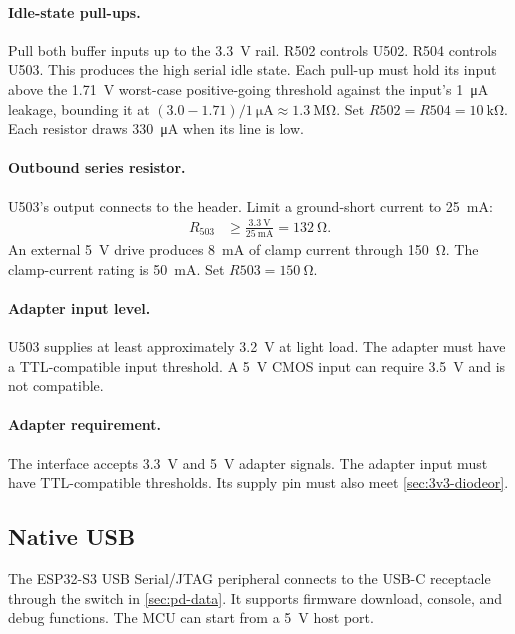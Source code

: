 \paragraph{Idle-state pull-ups.} Pull both buffer inputs up to the 3.3~V rail.
R502 controls U502. R504 controls U503. This produces the high serial idle
state. Each pull-up must hold its input above the
\SI{1.71}{\volt} worst-case positive-going threshold against the input's
\SI{1}{\micro\ampere} leakage, bounding it at
\((3.0-1.71)/\SI{1}{\micro\ampere}\approx\SI{1.3}{\mega\ohm}\). Set
$R502=R504=\SI{10}{\kilo\ohm}$. Each resistor draws
\SI{330}{\micro\ampere} when its line is low.

\paragraph{Outbound series resistor.} U503's output connects to the header.
Limit a ground-short current to \SI{25}{\milli\ampere}:
\begin{align*}
  R_{503} &\geq \frac{\SI{3.3}{\volt}}{\SI{25}{\milli\ampere}}
    = \SI{132}{\ohm}.
\end{align*}
An external \SI{5}{\volt} drive produces \SI{8}{\milli\ampere} of clamp
current through \SI{150}{\ohm}. The clamp-current rating is
\SI{50}{\milli\ampere}. Set $R503=\SI{150}{\ohm}$.

\paragraph{Adapter input level.} U503 supplies at least approximately
\SI{3.2}{\volt} at light load. The adapter must have a TTL-compatible input
threshold. A 5~V CMOS input can require \SI{3.5}{\volt} and is not compatible.

\paragraph{Adapter requirement.} The interface accepts 3.3~V and 5~V adapter
signals. The adapter input must have TTL-compatible thresholds. Its supply pin
must also meet \cref{sec:3v3-diodeor}.

\subsection{Native USB}
\label{sec:esp32-usb}

The ESP32-S3 USB Serial/JTAG peripheral connects to the USB-C receptacle through
the switch in \cref{sec:pd-data}. It supports firmware download, console, and
debug functions. The MCU can start from a \SI{5}{\volt} host port.

